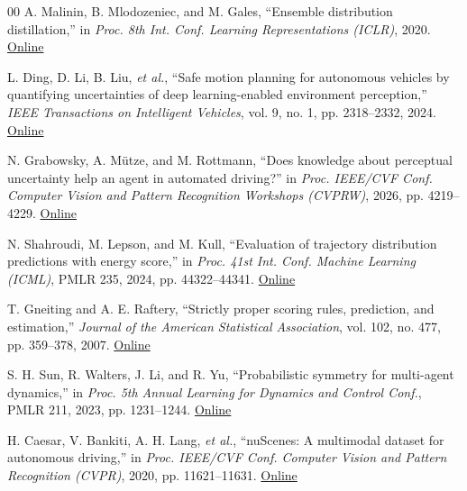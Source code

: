 \documentclass[lettersize,journal]{IEEEtran}
\begin{document}
\begin{thebibliography}{00}
 A. Malinin, B. Mlodozeniec, and M. Gales, ``Ensemble distribution distillation,'' in \textit{Proc. 8th Int. Conf. Learning Representations (ICLR)}, 2020. \href{https://openreview.net/forum?id=BygSP6Vtvr}{Online}

 L. Ding, D. Li, B. Liu, \textit{et al.}, ``Safe motion planning for autonomous vehicles by quantifying uncertainties of deep learning-enabled environment perception,'' \textit{IEEE Transactions on Intelligent Vehicles}, vol. 9, no. 1, pp. 2318--2332, 2024. \href{https://doi.org/10.1109/TIV.2023.3297735}{Online}

 N. Grabowsky, A. M\"{u}tze, and M. Rottmann, ``Does knowledge about perceptual uncertainty help an agent in automated driving?'' in \textit{Proc. IEEE/CVF Conf. Computer Vision and Pattern Recognition Workshops (CVPRW)}, 2026, pp. 4219--4229. \href{https://openaccess.thecvf.com/content/CVPR2026W/SAIAD/html/Grabowsky_Does_Knowledge_About_Perceptual_Uncertainty_Help_an_Agent_in_Automated_CVPRW_2026_paper.html}{Online}

 N. Shahroudi, M. Lepson, and M. Kull, ``Evaluation of trajectory distribution predictions with energy score,'' in \textit{Proc. 41st Int. Conf. Machine Learning (ICML)}, PMLR 235, 2024, pp. 44322--44341. \href{https://proceedings.mlr.press/v235/shahroudi24a.html}{Online}

 T. Gneiting and A. E. Raftery, ``Strictly proper scoring rules, prediction, and estimation,'' \textit{Journal of the American Statistical Association}, vol. 102, no. 477, pp. 359--378, 2007. \href{https://doi.org/10.1198/016214506000001437}{Online}

 S. H. Sun, R. Walters, J. Li, and R. Yu, ``Probabilistic symmetry for multi-agent dynamics,'' in \textit{Proc. 5th Annual Learning for Dynamics and Control Conf.}, PMLR 211, 2023, pp. 1231--1244. \href{https://proceedings.mlr.press/v211/sun23a.html}{Online}

 H. Caesar, V. Bankiti, A. H. Lang, \textit{et al.}, ``nuScenes: A multimodal dataset for autonomous driving,'' in \textit{Proc. IEEE/CVF Conf. Computer Vision and Pattern Recognition (CVPR)}, 2020, pp. 11621--11631. \href{https://arxiv.org/abs/1903.11027}{Online}

\end{thebibliography}

\end{document}
